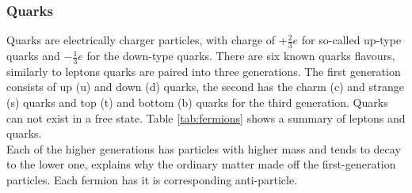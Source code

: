 \subsubsection{Quarks}
Quarks are electrically charger particles, with charge of $+\frac{2}{3}e$ for so-called up-type quarks and $-\frac{1}{3}e$ for the down-type quarks. There are six known quarks flavours, similarly to leptons quarks are paired into three generations. The first generation consists of up (u) and down (d) quarks, the second has the charm (c) and strange (s) quarks and top (t) and bottom (b) quarks for the third generation. Quarks can not exist in a free state. Table \ref{tab:fermions} shows a summary of leptons and quarks. \\
Each of the higher generations has particles with higher mass and tends to decay to the lower one, explains why the ordinary matter made off the first-generation particles. Each fermion has it is corresponding anti-particle.
